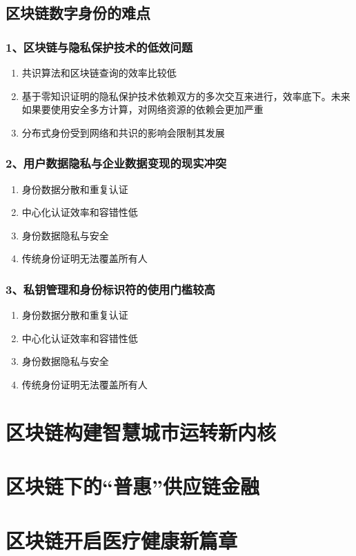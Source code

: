 \documentclass[11pt]{beamer}
\begin{document}
\subsection{区块链数字身份的难点}
\begin{frame}
	\frametitle{1、区块链与隐私保护技术的低效问题}
	\begin{enumerate}
		\item 共识算法和区块链查询的效率比较低
		\item 基于零知识证明的隐私保护技术依赖双方的多次交互来进行，效率底下。未来如果要使用安全多方计算，对网络资源的依赖会更加严重
		\item 分布式身份受到网络和共识的影响会限制其发展
	\end{enumerate}
\end{frame}

\begin{frame}
	\frametitle{2、用户数据隐私与企业数据变现的现实冲突}
	\begin{enumerate}
		\item 身份数据分散和重复认证
		\item 中心化认证效率和容错性低
		\item 身份数据隐私与安全
		\item 传统身份证明无法覆盖所有人
	\end{enumerate}
\end{frame}

\begin{frame}
	\frametitle{3、私钥管理和身份标识符的使用门槛较高}
	\begin{enumerate}
		\item 身份数据分散和重复认证
		\item 中心化认证效率和容错性低
		\item 身份数据隐私与安全
		\item 传统身份证明无法覆盖所有人
	\end{enumerate}
\end{frame}

\section{区块链构建智慧城市运转新内核}

\section{区块链下的“普惠”供应链金融}

\section{区块链开启医疗健康新篇章}
\end{document}
